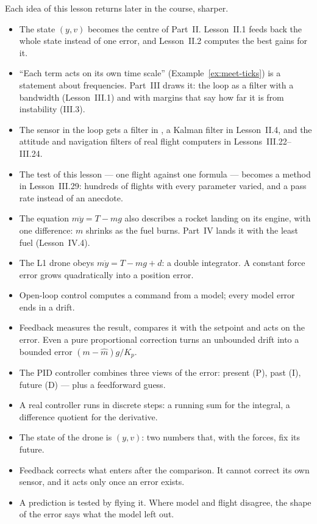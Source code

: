 \begin{lookahead}
Each idea of this lesson returns later in the course, sharper.
\begin{itemize}[leftmargin=1.2em]
  \item The state $(y, v)$ becomes the centre of Part~II. Lesson~II.1 feeds back the whole state instead of one error, and Lesson~II.2 computes the best gains for it.
  \item \enquote{Each term acts on its own time scale} (Example~\ref{ex:meet-ticks}) is a statement about frequencies. Part~III draws it: the loop as a filter with a bandwidth (Lesson~III.1) and with margins that say how far it is from instability (III.3).
  \item The sensor in the loop gets a filter in , a Kalman filter in Lesson~II.4, and the attitude and navigation filters of real flight computers in Lessons~III.22–III.24.
  \item The test of this lesson — one flight against one formula — becomes a method in Lesson~III.29: hundreds of flights with every parameter varied, and a pass rate instead of an anecdote.
  \item The equation $m\ddot y = T - mg$ also describes a rocket landing on its engine, with one difference: $m$ shrinks as the fuel burns. Part~IV lands it with the least fuel (Lesson~IV.4).
\end{itemize}
\end{lookahead}

\begin{remember}
\begin{itemize}
  \item The L1 drone obeys $m\ddot y = T - mg + d$: a double integrator. A constant force error grows quadratically into a position error.
  \item Open-loop control computes a command from a model; every model error ends in a drift.
  \item Feedback measures the result, compares it with the setpoint and acts on the error. Even a pure proportional correction turns an unbounded drift into a bounded error $(m - \hat m)g/K_p$.
  \item The PID controller combines three views of the error: present (P), past (I), future (D) — plus a feedforward guess.
  \item A real controller runs in discrete steps: a running sum for the integral, a difference quotient for the derivative.
  \item The state of the drone is $(y, v)$: two numbers that, with the forces, fix its future.
  \item Feedback corrects what enters after the comparison. It cannot correct its own sensor, and it acts only once an error exists.
  \item A prediction is tested by flying it. Where model and flight disagree, the shape of the error says what the model left out.
\end{itemize}
\end{remember}

